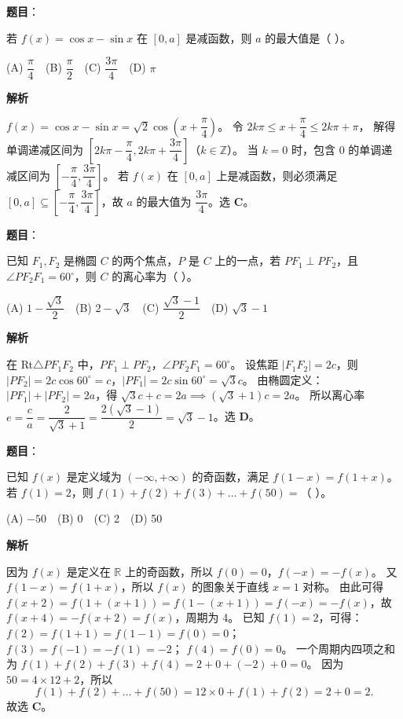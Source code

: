 \begin{answer}

\textbf{题目}：

若 $f(x)=\cos x-\sin x$ 在 $[0,a]$ 是减函数，则 $a$ 的最大值是（ ）。

(A) $\dfrac\pi4$　(B) $\dfrac\pi2$　(C) $\dfrac{3\pi}{4}$　(D) $\pi$

\textbf{解析}

$f(x) = \cos x - \sin x = \sqrt2\cos\left(x+\dfrac\pi4\right)$。
令 $2k\pi \leqslant x+\dfrac\pi4 \leqslant 2k\pi+\pi$，
解得单调递减区间为 $\left[2k\pi-\dfrac\pi4, 2k\pi+\dfrac{3\pi}{4}\right]$（$k\in\mathbb Z$）。
当 $k=0$ 时，包含 0 的单调递减区间为 $\left[-\dfrac\pi4, \dfrac{3\pi}{4}\right]$。
若 $f(x)$ 在 $[0,a]$ 上是减函数，则必须满足 $[0,a]\subseteq \left[-\dfrac\pi4, \dfrac{3\pi}{4}\right]$，故 $a$ 的最大值为 $\dfrac{3\pi}{4}$。选 \textbf{C}。


\end{answer}
\begin{answer}

\textbf{题目}：

已知 $F_1,F_2$ 是椭圆 $C$ 的两个焦点，$P$ 是 $C$ 上的一点，若 $PF_1\perp PF_2$，且 $\angle PF_2F_1=60^\circ$，则 $C$ 的离心率为（ ）。

(A) $1-\dfrac{\sqrt3}{2}$　(B) $2-\sqrt3$　(C) $\dfrac{\sqrt3-1}{2}$　(D) $\sqrt3-1$

\textbf{解析}

在 Rt$\triangle PF_1F_2$ 中，$PF_1\perp PF_2$，$\angle PF_2F_1 = 60^\circ$。
设焦距 $|F_1F_2| = 2c$，则 $|PF_2| = 2c\cos 60^\circ = c$，$|PF_1| = 2c\sin 60^\circ = \sqrt3 c$。
由椭圆定义：$|PF_1|+|PF_2| = 2a$，得 $\sqrt3 c + c = 2a \implies (\sqrt3+1)c = 2a$。
所以离心率 $e = \dfrac ca = \dfrac{2}{\sqrt3+1} = \dfrac{2(\sqrt3-1)}{2} = \sqrt3-1$。选 \textbf{D}。


\end{answer}
\begin{answer}

\textbf{题目}：

已知 $f(x)$ 是定义域为 $(-\infty,+\infty)$ 的奇函数，满足 $f(1-x)=f(1+x)$。若 $f(1)=2$，则 $f(1)+f(2)+f(3)+\dots+f(50)=$（ ）。

(A) $-50$　(B) 0　(C) 2　(D) 50

\textbf{解析}

因为 $f(x)$ 是定义在 $\mathbb R$ 上的奇函数，所以 $f(0)=0$，$f(-x)=-f(x)$。
又 $f(1-x)=f(1+x)$，所以 $f(x)$ 的图象关于直线 $x=1$ 对称。
由此可得 $f(x+2) = f(1+(x+1)) = f(1-(x+1)) = f(-x) = -f(x)$，故 $f(x+4) = -f(x+2) = f(x)$，周期为 4。
已知 $f(1)=2$，可得：
$f(2) = f(1+1) = f(1-1) = f(0) = 0$；
$f(3) = f(-1) = -f(1) = -2$；
$f(4) = f(0) = 0$。
一个周期内四项之和为 $f(1)+f(2)+f(3)+f(4) = 2+0+(-2)+0 = 0$。
因为 $50 = 4\times 12 + 2$，所以
\nopagebreak[4]
\[f(1)+f(2)+\dots+f(50) = 12\times 0 + f(1) + f(2) = 2+0 = 2.\]
故选 \textbf{C}。


\end{answer}
